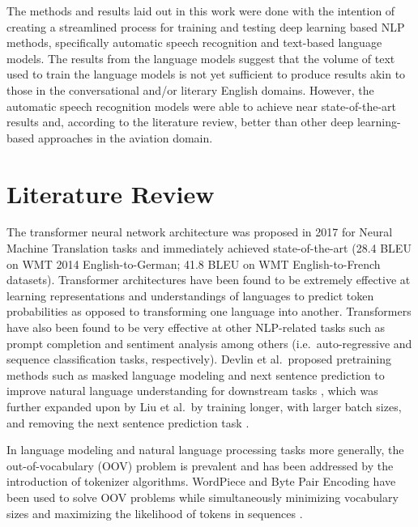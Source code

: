 \documentclass[12pt]{article}
\begin{document}
The methods and results laid out in this work were done with the intention of creating a streamlined process for training and testing deep learning
based NLP methods, specifically automatic speech recognition and text-based language models. The results from the language models suggest that the
volume of text used to train the language models is not yet sufficient to produce results akin to those in the conversational and/or literary English
domains. However, the automatic speech recognition models were able to achieve near state-of-the-art results and, according to the literature review,
better than other deep learning-based approaches in the aviation domain.

\section{Literature Review}\label{sec:lit_review}
The transformer neural network architecture was proposed in 2017 for Neural Machine Translation tasks and immediately achieved
state-of-the-art (28.4 BLEU on WMT 2014 English-to-German; 41.8 BLEU on WMT English-to-French datasets)\cite{vaswani_attention_2017}. Transformer
architectures have been found to be extremely effective at learning representations and understandings of languages to predict token probabilities as
opposed to transforming one language into another\cite{devlin_bert_2019,liu_roberta_2019}. Transformers have also been found to be very effective at
other NLP-related tasks such as prompt completion and sentiment analysis among others (i.e.~auto-regressive and sequence classification tasks,
respectively)\cite{lewis_bart_2019,radford_improving_2018}. Devlin et al.~proposed pretraining methods such as masked language
modeling and next sentence prediction to improve natural language understanding for downstream tasks \cite{devlin_bert_2019}, which was further
expanded upon by Liu et al.~by training longer, with larger batch sizes, and removing the next sentence prediction task \cite{liu_roberta_2019}.

In language modeling and natural language processing tasks more generally, the out-of-vocabulary (OOV) problem is prevalent and has been addressed by
the introduction of tokenizer algorithms. WordPiece and Byte Pair Encoding have been used to solve OOV problems while simultaneously minimizing
vocabulary sizes and maximizing the likelihood of tokens in sequences \cite{wu_googles_2016,schuster_japanese_2012,sennrich_neural_2016}.
\end{document}
